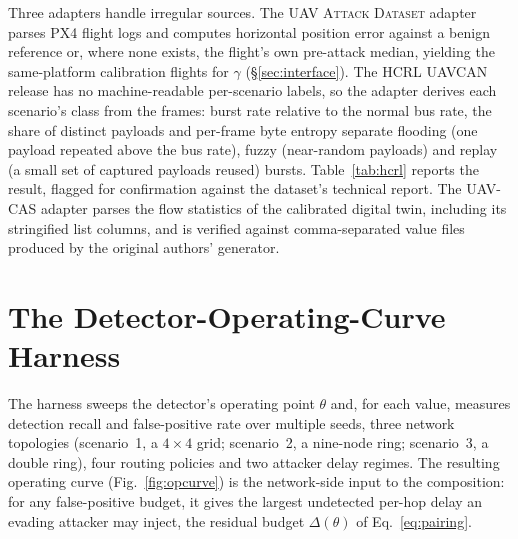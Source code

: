 \documentclass[conference,letterpaper,10pt]{IEEEtran}   %
\newcommand{\dataset}[1]{\textsc{#1}}
\newcommand{\code}[1]{\texttt{#1}}
\begin{document}
Three adapters handle irregular sources. The \dataset{UAV Attack Dataset}
adapter parses PX4 flight logs and computes horizontal position error against a
benign reference or, where none exists, the flight's own pre-attack median,
yielding the same-platform calibration flights for $\gamma$
(\S\ref{sec:interface}). The \dataset{HCRL UAVCAN} release has no
machine-readable per-scenario labels, so the adapter derives each scenario's
class from the frames: burst rate relative to the normal bus rate, the share of
distinct payloads and per-frame byte entropy separate flooding (one payload
repeated above the bus rate), fuzzy (near-random payloads) and replay (a small
set of captured payloads reused) bursts. Table~\ref{tab:hcrl} reports the result,
flagged for confirmation against the dataset's technical report. The
\dataset{UAV-CAS} adapter parses the flow statistics of the calibrated digital
twin, including its stringified list columns, and is verified against
comma-separated value files produced by the original authors' generator.

\begin{table}[t]
\centering
\caption{The corpus as actually ingested. Counts come from schema-validated
adapter outputs; every record validates against the schema of
\S\ref{sec:schema}.}
\label{tab:ingest}
\footnotesize
\renewcommand{\arraystretch}{1.1}

\end{table}

\begin{table}[t]
\centering
\caption{Attack classes derived from the frames of the \dataset{HCRL UAVCAN}
scenarios, inferred from burst rate, share of distinct payloads and byte
entropy; scenarios that exhibit more than one burst shape map to
\code{collaborative}.}
\label{tab:hcrl}
\footnotesize
\renewcommand{\arraystretch}{1.05}

\end{table}

\section{The Detector-Operating-Curve Harness}
\label{sec:harness}
The harness sweeps the detector's operating point $\theta$ and, for each value,
measures detection recall and false-positive rate over multiple seeds, three
network topologies (scenario~1, a $4{\times}4$ grid; scenario~2, a nine-node ring;
scenario~3, a double ring), four routing policies and two attacker delay regimes. The
resulting operating curve (Fig.~\ref{fig:opcurve}) is the network-side input to
the composition: for any false-positive budget, it gives the largest undetected
per-hop delay an evading attacker may inject, the residual budget
$\Delta(\theta)$ of Eq.~\eqref{eq:pairing}.
\end{document}
